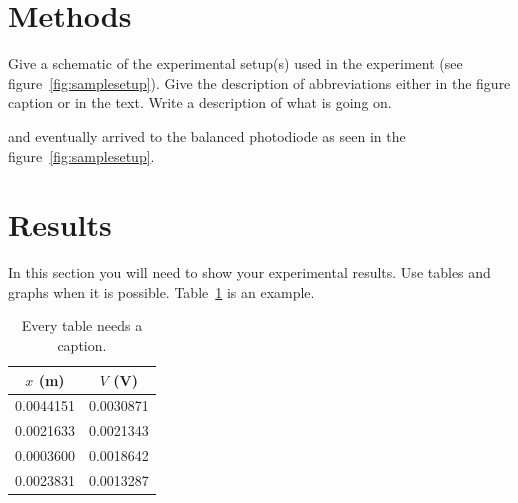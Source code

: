 \documentclass{article}
\begin{document}
\blindtext %

\section{Methods}


Give a schematic of the experimental setup(s) used in the experiment (see
figure~\ref{fig:samplesetup}). Give the description of  abbreviations
either in the figure caption or in the text. Write a description of what is
going on. 


and eventually arrived to the
balanced photodiode as seen in the figure~\ref{fig:samplesetup}.


\section{Results}

In this section you will need to show your experimental results. Use tables and
graphs when it is possible. Table~\ref{tbl:bins} is an example.

\begin{table}[ht]
\begin{center}
\caption{Every table needs a caption.}
\label{tbl:bins} %
\begin{tabular}{|cc|} 
\hline
\multicolumn{1}{|c}{$x$ (m)} & \multicolumn{1}{c|}{$V$ (V)} \\
\hline
0.0044151 &   0.0030871 \\
0.0021633 &   0.0021343 \\
0.0003600 &   0.0018642 \\
0.0023831 &   0.0013287 \\
\hline
\end{tabular}
\end{center}
\end{table}
\end{document}
